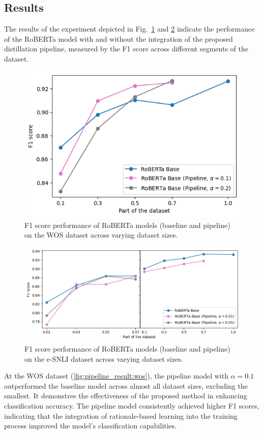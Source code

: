 \subsection*{Results}

The results of the experiment depicted in Fig.\ \ref{fig:pipeline_result:wos} and \ref{fig:pipeline_result:esnli} indicate the performance of the RoBERTa model with and without the integration of the proposed distillation pipeline, measured by the F1 score across different segments of the dataset.

\begin{figure}[p]
    \centering
    \includegraphics[width=0.63\linewidth]{figs/pipeline_wos.png}
    \caption{F1 score performance of RoBERTa models (baseline and pipeline) on the WOS dataset across varying dataset sizes.}
    \label{fig:pipeline_result:wos}
\end{figure}

\begin{figure}[p]
    \centering
    \includegraphics[width=\linewidth]{figs/pipeline_esnli.png}
    \caption{F1 score performance of RoBERTa models (baseline and pipeline) on the e-SNLI dataset across varying dataset sizes.}
    \label{fig:pipeline_result:esnli}
\end{figure}

At the WOS dataset (\autoref{fig:pipeline_result:wos}), the pipeline model with $\alpha = 0.1$ outperformed the baseline model across almost all dataset sizes, excluding the smallest. It demonstres the effectiveness of the proposed method in enhancing classification accuracy. The pipeline model consistently achieved higher F1 scores, indicating that the integration of rationale-based learning into the training process improved the model's classification capabilities.

